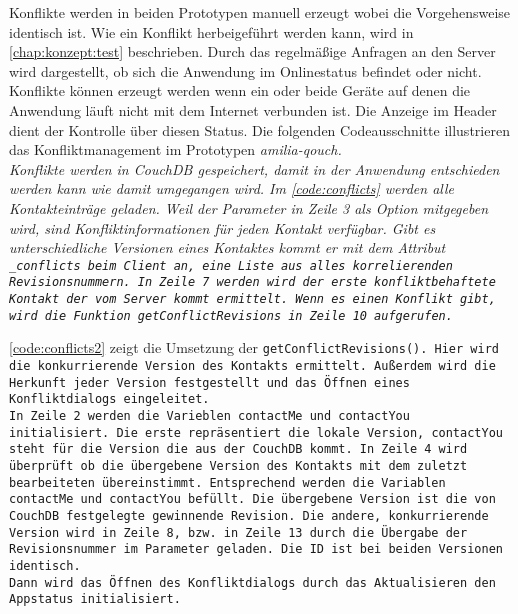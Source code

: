 Konflikte werden in beiden Prototypen manuell erzeugt wobei die Vorgehensweise identisch ist.
Wie ein Konflikt herbeigeführt werden kann, wird in \autoref{chap:konzept:test} beschrieben.
Durch das regelmäßige Anfragen an den Server wird dargestellt, ob sich die Anwendung im Onlinestatus befindet oder nicht.
Konflikte können erzeugt werden wenn ein oder beide Geräte auf denen die Anwendung läuft nicht mit dem Internet verbunden ist. Die Anzeige im Header dient der Kontrolle über diesen Status.
Die folgenden Codeausschnitte illustrieren das Konfliktmanagement im Prototypen \it{amilia-qouch}.\\
Konflikte werden in CouchDB gespeichert, damit in der Anwendung entschieden werden kann wie damit umgegangen wird.
Im \autoref{code:conflicts} werden alle Kontakteinträge geladen.
Weil der Parameter in Zeile 3 als Option mitgegeben wird, sind Konfliktinformationen für jeden Kontakt verfügbar.
Gibt es unterschiedliche Versionen eines Kontaktes kommt er mit dem Attribut \tt{\_conflicts} beim Client an, eine Liste aus alles korrelierenden Revisionsnummern.
In Zeile 7 werden wird der erste konfliktbehaftete Kontakt der vom Server kommt ermittelt. Wenn es einen Konflikt gibt, wird die Funktion \tt{getConflictRevisions} in Zeile 10 aufgerufen.
%
\begin{center}
  
\end{center}
%
\autoref{code:conflicts2} zeigt die Umsetzung der \tt{getConflictRevisions()}.
Hier wird die konkurrierende Version des Kontakts ermittelt. Außerdem wird die Herkunft jeder Version festgestellt und das Öffnen eines Konfliktdialogs eingeleitet.\\
In Zeile 2 werden die Varieblen \tt{contactMe} und \tt{contactYou} initialisiert. Die erste repräsentiert die lokale Version, \tt{contactYou} steht für die Version die aus der CouchDB kommt.
In Zeile 4 wird überprüft ob die übergebene Version des Kontakts mit dem zuletzt bearbeiteten übereinstimmt. Entsprechend werden die Variablen \tt{contactMe} und \tt{contactYou} befüllt.
Die übergebene Version ist die von CouchDB festgelegte gewinnende Revision.
Die andere, konkurrierende Version wird in Zeile 8, bzw. in Zeile 13 durch die Übergabe der Revisionsnummer im Parameter geladen.
Die ID ist bei beiden Versionen identisch.\\
Dann wird das Öffnen des Konfliktdialogs durch das Aktualisieren den \gls{App}status initialisiert.
